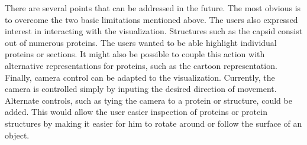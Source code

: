 \documentclass[review,journal]{vgtc}         %
\begin{document}
	There are several points that can be addressed in the future. The most obvious is to overcome the two basic limitations mentioned above. 
	The users also expressed interest in interacting with the visualization. 
	Structures such as the capsid consist out of numerous proteins. 
	The users wanted to be able highlight individual proteins or sections. 
	It might also be possible to couple this action with alternative representations for proteins, such as the cartoon representation.
	Finally, camera control can be adapted to the visualization. 
	Currently, the camera is controlled simply by inputing the desired direction of movement. 
	Alternate controls, such as tying the camera to a protein or structure, could be added.
	This would allow the user easier inspection of proteins or protein structures by making it easier for him to rotate around or follow the surface of an object.
	
	
	
	
	
	{}
	
\end{document}
